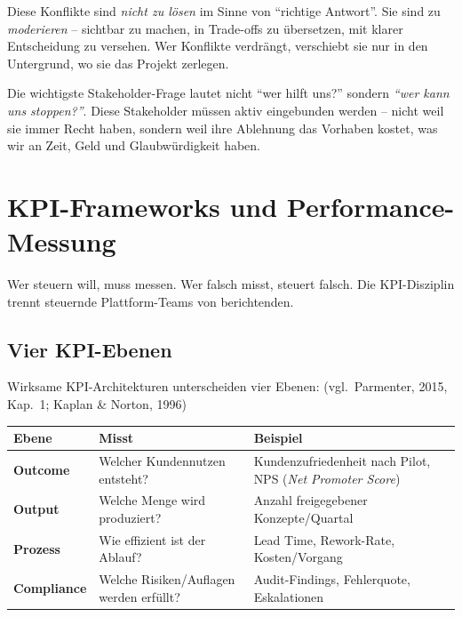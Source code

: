 \documentclass[11pt,a4paper,oneside]{article}
\newcommand{\quelle}[1]{{\footnotesize\color{lpGray}(#1)}}
\begin{document}
Diese Konflikte sind \emph{nicht zu lösen} im Sinne von ``richtige Antwort''. Sie sind zu \emph{moderieren} -- sichtbar zu machen, in Trade-offs zu übersetzen, mit klarer Entscheidung zu versehen. Wer Konflikte verdrängt, verschiebt sie nur in den Untergrund, wo sie das Projekt zerlegen.

\begin{merkbox}
Die wichtigste Stakeholder-Frage lautet nicht ``wer hilft uns?'' sondern \emph{``wer kann uns stoppen?''}. Diese Stakeholder müssen aktiv eingebunden werden -- nicht weil sie immer Recht haben, sondern weil ihre Ablehnung das Vorhaben kostet, was wir an Zeit, Geld und Glaubwürdigkeit haben.
\end{merkbox}

\section{KPI-Frameworks und Performance-Messung}

Wer steuern will, muss messen. Wer falsch misst, steuert falsch. Die KPI-Disziplin trennt steuernde Plattform-Teams von berichtenden.

\subsection{Vier KPI-Ebenen}

Wirksame KPI-Architekturen unterscheiden vier Ebenen: \quelle{vgl.\ Parmenter, 2015, Kap.~1; Kaplan \& Norton, 1996}

\begin{tabularx}{\linewidth}{@{}>{\bfseries}lXX@{}}
\toprule
Ebene & Misst & Beispiel \\
\midrule
Outcome     & Welcher Kundennutzen entsteht?         & Kundenzufriedenheit nach Pilot, NPS (\emph{Net Promoter Score}) \\
Output      & Welche Menge wird produziert?           & Anzahl freigegebener Konzepte/Quartal \\
Prozess     & Wie effizient ist der Ablauf?          & Lead Time, Rework-Rate, Kosten/Vorgang \\
Compliance  & Welche Risiken/Auflagen werden erfüllt? & Audit-Findings, Fehlerquote, Eskalationen \\
\bottomrule
\end{tabularx}

\medskip
\end{document}

